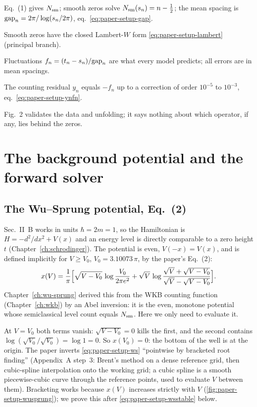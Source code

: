 \begin{keyideas}
\item Eq.~(1) gives $N_{\mathrm{sm}}$; smooth zeros solve $N_{\mathrm{sm}}(s_n)=n-\tfrac12$; the mean spacing is $\mathrm{gap}_n=2\pi/\log(s_n/2\pi)$, eq.~\eqref{eq:paper-setup-gap}.
\item Smooth zeros have the closed Lambert-$W$ form \eqref{eq:paper-setup-lambert} (principal branch).
\item Fluctuations $f_n=(t_n-s_n)/\mathrm{gap}_n$ are what every model predicts; all errors are in mean spacings.
\item The counting residual $y_n$ equals $-f_n$ up to a correction of order $10^{-5}$ to $10^{-3}$, eq.~\eqref{eq:paper-setup-ynfn}.
\item Fig.~2 validates the data and unfolding; it says nothing about which operator, if any, lies behind the zeros.
\end{keyideas}

\section{The background potential and the forward solver}\label{sec:paper-setup-solver}

\subsection{The Wu--Sprung potential, Eq.~(2)}

Sec.~II~B works in units $\hbar=2m=1$, so the Hamiltonian is $H=-d^2/dx^2+V(x)$ and an energy level is directly comparable to a zero height $t$ (Chapter~\ref{ch:schrodinger}). The potential is even, $V(-x)=V(x)$, and is defined implicitly for $V\ge V_0$, $V_0=3.10073\,\pi$, by the paper's Eq.~(2):
\begin{equation}
x(V)=\frac1\pi\Bigl[\sqrt{V-V_0}\,\log\frac{V_0}{2\pi e^2}
+\sqrt V\,\log\frac{\sqrt V+\sqrt{V-V_0}}{\sqrt V-\sqrt{V-V_0}}\Bigr].
\label{eq:paper-setup-ws}
\end{equation}
Chapter~\ref{ch:wu-sprung} derived this from the WKB counting function (Chapter~\ref{ch:wkb}) by an Abel inversion: it is the even, monotone potential whose semiclassical level count equals $N_{\mathrm{sm}}$. Here we only need to evaluate it.

At $V=V_0$ both terms vanish: $\sqrt{V-V_0}=0$ kills the first, and the second contains $\log(\sqrt{V_0}/\sqrt{V_0})=\log1=0$. So $x(V_0)=0$: the bottom of the well is at the origin. The paper inverts \eqref{eq:paper-setup-ws} ``pointwise by bracketed root finding'' (Appendix~A step~3: Brent's method on a dense reference grid, then cubic-spline interpolation onto the working grid; a cubic spline is a smooth piecewise-cubic curve through the reference points, used to evaluate $V$ between them). Bracketing works because $x(V)$ increases strictly with $V$ (\cref{fig:paper-setup-wusprung}); we prove this after \eqref{eq:paper-setup-wsstable} below.

